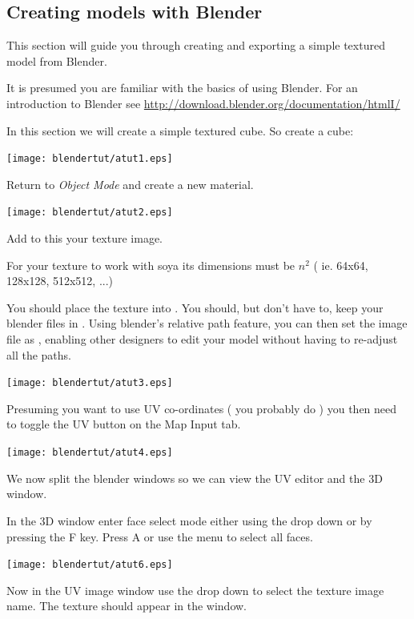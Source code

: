 \subsection{Creating models with Blender}
This section will guide you through creating and exporting a simple textured 
model from Blender. 

\begin{notice} 
  It is presumed you are familiar with the basics of using Blender. For an
  introduction to Blender see 
  \url{http://download.blender.org/documentation/htmlI/}
\end{notice}

In this section we will create a simple textured cube. So create a cube:

\texttt{[image: blendertut/atut1.eps]}

Return to \emph{Object Mode} and create a new material. 

\texttt{[image: blendertut/atut2.eps]}

Add to this your texture image. 

\begin{notice}
  For your texture to work with soya its dimensions must be $n^2$ ( ie. 64x64,
  128x128, 512x512, ...)
\end{notice}

You should place the texture into .
You should, but don't have to, keep your blender files in . 
Using blender's relative path feature, you can then set the image
file as , enabling other designers
to edit your model without having to re-adjust all the paths. 

\texttt{[image: blendertut/atut3.eps]}

Presuming you want to use UV co-ordinates ( you probably do ) you then need to 
toggle the UV button on the Map Input tab.

\texttt{[image: blendertut/atut4.eps]}

We now split the blender windows so we can view the UV editor and the 3D window.

In the 3D window enter face select mode either using the drop down or by 
pressing the F key. Press A or use the menu to select all faces. 

\texttt{[image: blendertut/atut6.eps]}

Now in the UV image window use the drop down to select the texture image name. 
The texture should appear in the window. 

